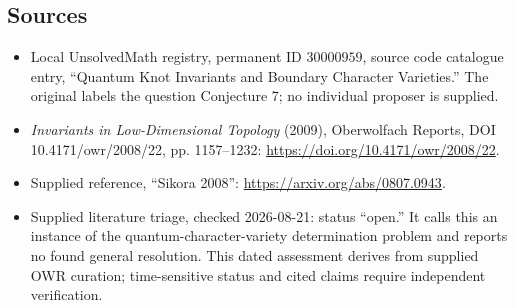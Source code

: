 \documentclass[11pt]{article}
\begin{document}
\subsection{Sources}
\begin{itemize}
\item Local UnsolvedMath registry, permanent ID \(30000959\), source code catalogue entry, ``Quantum Knot Invariants and Boundary Character Varieties.'' The original labels the question Conjecture 7; no individual proposer is supplied.
\item \emph{Invariants in Low-Dimensional Topology} (2009), Oberwolfach Reports, DOI 10.4171/owr/2008/22, pp. 1157--1232: \url{https://doi.org/10.4171/owr/2008/22}.
\item Supplied reference, ``Sikora 2008'': \url{https://arxiv.org/abs/0807.0943}.
\item Supplied literature triage, checked 2026-08-21: status ``open.'' It calls this an instance of the quantum-character-variety determination problem and reports no found general resolution. This dated assessment derives from supplied OWR curation; time-sensitive status and cited claims require independent verification.
\end{itemize}
\end{document}
